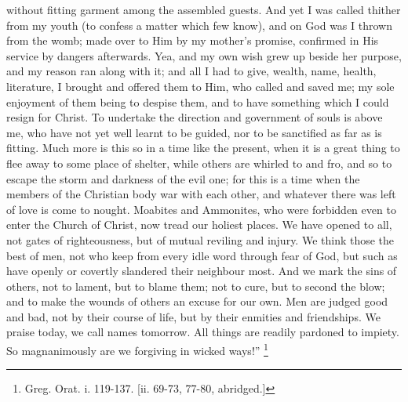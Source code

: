 without fitting garment among the assembled guests. And yet I was
called thither from my youth (to confess a matter which few know), and
on God was I thrown from the womb; made over to Him by my mother's
promise, confirmed in His service by dangers afterwards. Yea, and my
own wish grew up beside her purpose, and my reason ran along with it;
and all I had to give, wealth, name, health, literature, I brought and
offered them to Him, who called and saved me; my sole enjoyment of
them being to despise them, and to have something which I could resign
for Christ. To undertake the direction and government of souls is
above me, who have not yet well learnt to be guided, nor to be
sanctified as far as is fitting. Much more is this so in a time like
the present, when it is a great thing to flee away to some place of
shelter, while others are whirled to and fro, and so to escape the
storm and darkness of the evil one; for this is a time when the
members of the Christian body war with each other, and whatever there
was left of love is come to nought. Moabites and Ammonites, who were
forbidden even to enter the Church of Christ, now tread our holiest
places. We have opened to all, not gates of righteousness, but of
mutual reviling and injury. We think those the best of men, not who
keep from every idle word through fear of God, but such as have openly
or covertly slandered their neighbour most. And we mark the sins
of others, not to lament, but to blame them; not to cure, but to
second the blow; and to make the wounds of others an excuse for our
own. Men are judged good and bad, not by their course of life, but by
their enmities and friendships. We praise today, we call names
tomorrow. All things are readily pardoned to impiety. So magnanimously
are we forgiving in wicked ways!'' \footnote{Greg. Orat. i. 119-137. [ii. 69-73, 77-80,
abridged.]}


